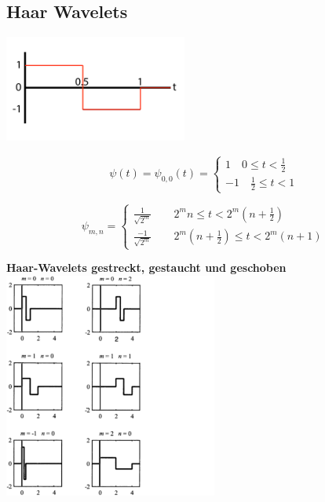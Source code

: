\subsection{Haar Wavelets }
\begin{center}
	\begin{minipage}[c]{0.65\textwidth}
    \begin{center}
    \includegraphics[width=6cm]{content/HaarWavelet.pdf}
    \end{center}
    \[
      \psi(t) = \psi_{0,0}(t)=\begin{cases} 1 \quad 0 \leq t < \frac{1}{2}\\ -1 \quad \frac{1}{2} \leq t < 1  \end{cases}
    \]
    
    \[	\psi_{m,n}  = \begin{cases} 
    	\frac{1}{\sqrt{2^m}} \qquad 2^m n \leq t < 2^m(n+\frac{1}{2}) \\ 
    	\frac{-1}{\sqrt{2^m}} \qquad 2^m(n+\frac{1}{2}) \leq t < 2^m(n+1)
    	\end{cases}
    \]
    
	\end{minipage}
	\begin{minipage}{0.3\textwidth}
	\textbf{Haar-Wavelets gestreckt, gestaucht und geschoben}\\
	\includegraphics[width=7cm]{./Content/HaarStretchedMoved}
	\end{minipage}
\end{center}



